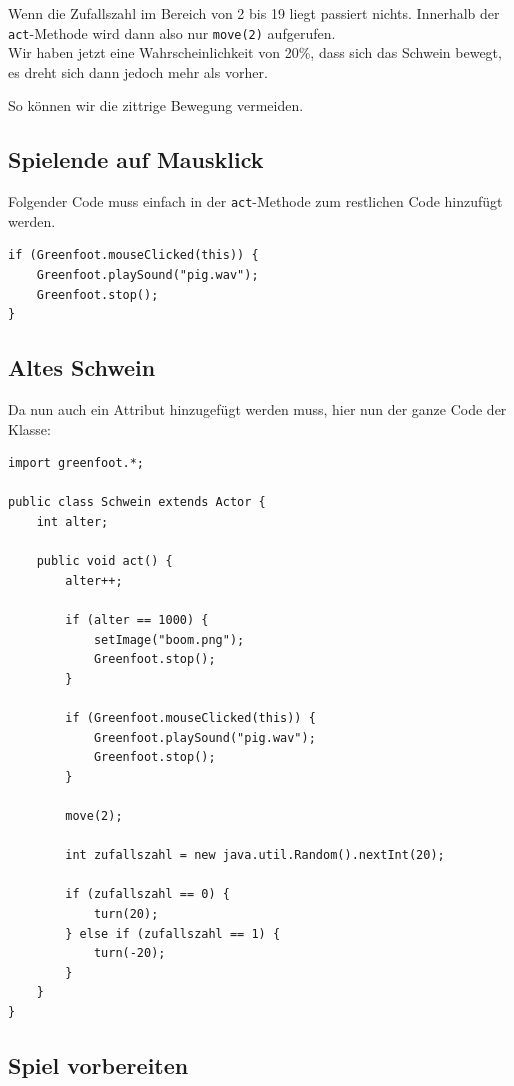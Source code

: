 \documentclass{scrartcl}   %
\begin{document}
Wenn die Zufallszahl im Bereich von 2 bis 19 liegt passiert nichts. Innerhalb der \texttt{act}-Methode wird dann also nur \texttt{move(2)} aufgerufen.\\
Wir haben jetzt eine Wahrscheinlichkeit von 20\%, dass sich das Schwein bewegt, es dreht sich dann jedoch mehr als vorher.

So können wir die zittrige Bewegung vermeiden.

\subsection{Spielende auf Mausklick}

Folgender Code muss einfach in der \texttt{act}-Methode zum restlichen Code hinzufügt werden.\\
\begin{lstlisting}
if (Greenfoot.mouseClicked(this)) {
    Greenfoot.playSound("pig.wav");
    Greenfoot.stop();
}
\end{lstlisting}

\newpage

\subsection{Altes Schwein}

Da nun auch ein Attribut hinzugefügt werden muss, hier nun der ganze Code der Klasse:\\
\begin{lstlisting}
import greenfoot.*;

public class Schwein extends Actor {
    int alter;
    
    public void act() {
        alter++;
        
        if (alter == 1000) {
            setImage("boom.png");
            Greenfoot.stop();
        }
        
        if (Greenfoot.mouseClicked(this)) {
            Greenfoot.playSound("pig.wav");
            Greenfoot.stop();
        }
        
        move(2);
        
        int zufallszahl = new java.util.Random().nextInt(20);
        
        if (zufallszahl == 0) {
            turn(20);
        } else if (zufallszahl == 1) { 
            turn(-20);
        }
    }    
}
\end{lstlisting}

\newpage

\subsection{Spiel vorbereiten}
\end{document}
